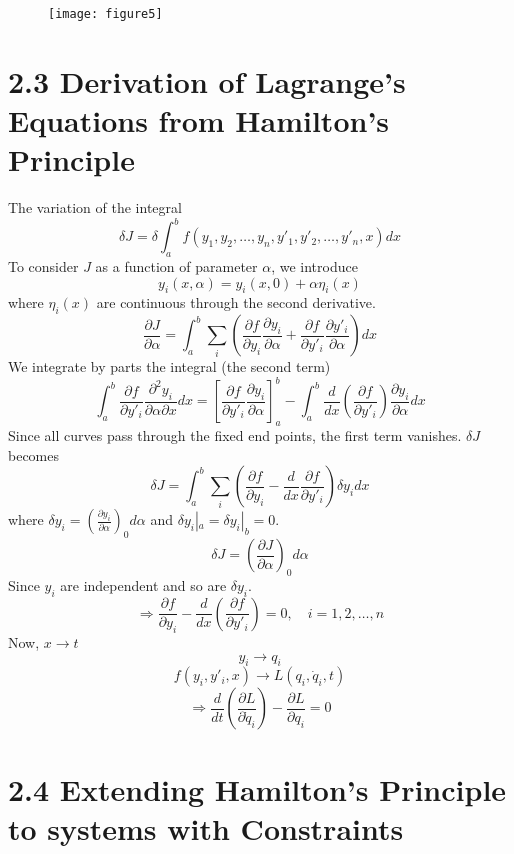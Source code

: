 \documentclass[12pt]{article}
\begin{document}
\begin{enumerate}
        \begin{figure}[h]
        	\centering
        	\texttt{[image: figure5]}
	        \caption{}
        	\label{fig:figure5}
        \end{figure}
	\end{enumerate}
	
	\section*{2.3 Derivation of Lagrange's Equations from Hamilton's Principle}
	
	The variation of the integral
	$$ \delta J = \delta \int_a^b f(y_1, y_2, \dots, y_n, y'_1, y'_2, \dots, y'_n, x) dx $$
	To consider $J$ as a function of parameter $\alpha$, we introduce
	$$ y_i(x, \alpha) = y_i(x, 0) + \alpha \eta_i(x) $$
	where $\eta_i(x)$ are continuous through the second derivative.
	$$ \frac{\partial J}{\partial \alpha} = \int_a^b \sum_i (\frac{\partial f}{\partial y_i} \frac{\partial y_i}{\partial \alpha} + \frac{\partial f}{\partial y'_i} \frac{\partial y'_i}{\partial \alpha}) dx $$
	We integrate by parts the integral (the second term)
	$$ \int_a^b \frac{\partial f}{\partial y'_i} \frac{\partial^2 y_i}{\partial \alpha \partial x} dx = [\frac{\partial f}{\partial y'_i} \frac{\partial y_i}{\partial \alpha}]_a^b - \int_a^b \frac{d}{dx}(\frac{\partial f}{\partial y'_i}) \frac{\partial y_i}{\partial \alpha} dx $$
	Since all curves pass through the fixed end points, the first term vanishes. $\delta J$ becomes
	$$ \delta J = \int_a^b \sum_i (\frac{\partial f}{\partial y_i} - \frac{d}{dx} \frac{\partial f}{\partial y'_i}) \delta y_i dx $$
	where $\delta y_i = (\frac{\partial y_i}{\partial \alpha})_0 d\alpha$ and $\delta y_i|_a = \delta y_i|_b = 0$.
	$$ \delta J = (\frac{\partial J}{\partial \alpha})_0 d\alpha $$
	Since $y_i$ are independent and so are $\delta y_i$.
	$$ \Rightarrow \frac{\partial f}{\partial y_i} - \frac{d}{dx}(\frac{\partial f}{\partial y'_i}) = 0, \quad i=1, 2, \dots, n $$
	Now, $x \to t$
	$$ y_i \to q_i $$
	$$ f(y_i, y'_i, x) \to L(q_i, \dot{q}_i, t) $$
	$$ \Rightarrow \frac{d}{dt}(\frac{\partial L}{\partial \dot{q}_i}) - \frac{\partial L}{\partial q_i} = 0 $$
	
	\section*{2.4 Extending Hamilton's Principle to systems with Constraints}
	
\end{document}
